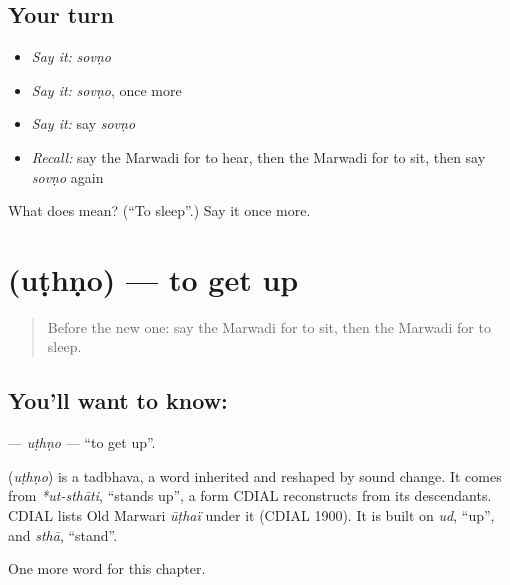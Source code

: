 \subsection*{Your turn}
\begin{itemize}
\raggedright
  \item \emph{Say it:} \emph{sovṇo}
  \item \emph{Say it:} \emph{sovṇo}, once more
  \item \emph{Say it:} say \emph{sovṇo}
  \item \emph{Recall:} say the Marwadi for to hear, then the Marwadi for to sit, then say \emph{sovṇo} again
\end{itemize}

\begin{tcolorbox}[breakable,colback=teal!4,colframe=teal!35!black,title={Before you move on}]
What does  mean? (\textquotedblleft{}To sleep\textquotedblright{}.) Say it once more.
\end{tcolorbox}
\section[\texorpdfstring{\mw{उठणो} (uṭhṇo)}{उठणो (uṭhṇo)}]{ (uṭhṇo) — to get up}

\label{lesson:MW-C52-uthno}



\begin{quote}
Before the new one: say the Marwadi for to sit, then the Marwadi for to sleep.
\end{quote}

\subsection*{You'll want to know: }
\textbf{} — \emph{uṭhṇo} — \textquotedblleft{}to get up\textquotedblright{}.

\begin{cousinweb}
\textbf{} (\emph{uṭhṇo}) is a tadbhava, a word inherited and reshaped by sound change. It comes from \emph{*ut-sthāti}, \textquotedblleft{}stands up\textquotedblright{}, a form CDIAL reconstructs from its descendants. CDIAL lists Old Marwari \emph{ūṭhaï} under it (CDIAL 1900). It is built on \emph{ud}, \textquotedblleft{}up\textquotedblright{}, and \emph{sthā}, \textquotedblleft{}stand\textquotedblright{}.
\end{cousinweb}

\begin{grammarlens}[title={What you've built}]
One more word for this chapter.
\end{grammarlens}

